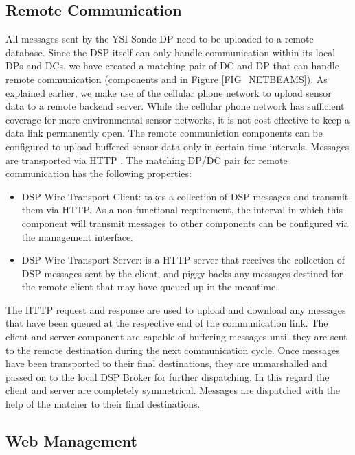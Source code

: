 \documentclass[conference]{IEEEtran}
\begin{document}
\subsection{Remote Communication}

All messages sent by the YSI Sonde DP need to be uploaded to a remote
database. Since the DSP itself can only handle communication within
its local DPs and DCs, we have created a matching pair of DC and DP
that can handle remote communication (components  and  in Figure
\ref{FIG_NETBEAMS}). As explained earlier, we make use of the cellular
phone network to upload sensor data to a remote backend server. While
the cellular phone network has sufficient coverage for more
environmental sensor networks, it is not cost effective to keep a data
link permanently open. The remote communiction components can be
configured to upload buffered sensor data only in certain time
intervals. Messages are transported via HTTP \cite{RFC2068}. The
matching DP/DC pair for remote communication has the following
properties:

\begin{itemize}
\item DSP Wire Transport Client: takes a collection of DSP messages
  and transmit them via HTTP. As a non-functional requirement, the
  interval in which this component will transmit messages to other
  components can be configured via the management interface.
\item DSP Wire Transport Server: is a HTTP server that receives the
  collection of DSP messages sent by the client, and piggy backs any
  messages destined for the remote client that may have queued up in
  the meantime.
\end{itemize}

The HTTP request and response are used to upload and download any
messages that have been queued at the respective end of the
communication link. The client and server component are capable of
buffering messages until they are sent to the remote destination
during the next communication cycle. Once messages have been
transported to their final destinations, they are unmarshalled and
passed on to the local DSP Broker for further dispatching. In this
regard the client and server are completely symmetrical. Messages are
dispatched with the help of the matcher to their final destinations.


\subsection{Web Management}
\end{document}
